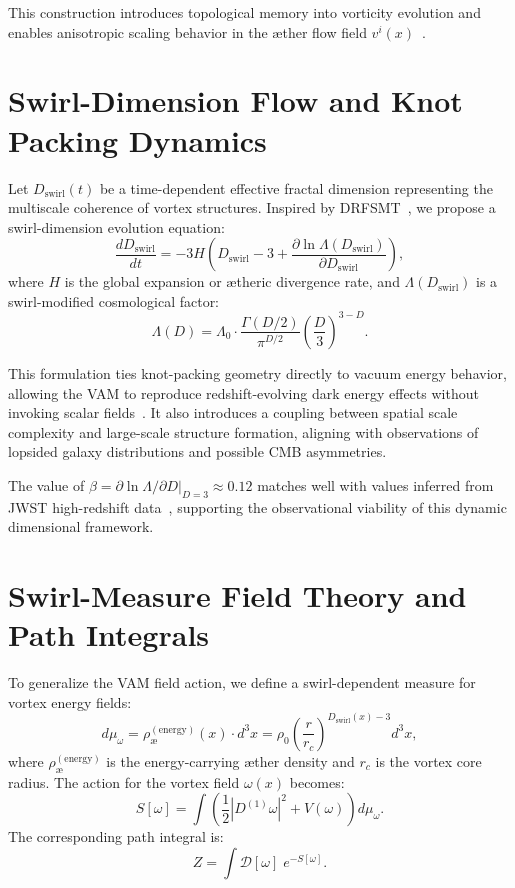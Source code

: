 \documentclass[11pt]{article}
\begin{document}
    This construction introduces topological memory into vorticity evolution and enables anisotropic scaling behavior in the æther flow field \( v^i(x) \)~\cite{zhou2025drfsmt}.

    \section{Swirl-Dimension Flow and Knot Packing Dynamics}

    Let \( D_\text{swirl}(t) \) be a time-dependent effective fractal dimension representing the multiscale coherence of vortex structures. Inspired by DRFSMT~\cite{zhou2025drfsmt}, we propose a swirl-dimension evolution equation:
    \[
        \frac{d D_\text{swirl}}{dt} = -3H \left( D_\text{swirl} - 3 + \frac{\partial \ln \Lambda(D_\text{swirl})}{\partial D_\text{swirl}} \right),
    \]
    where \( H \) is the global expansion or ætheric divergence rate, and \( \Lambda(D_\text{swirl}) \) is a swirl-modified cosmological factor:
    \[
        \Lambda(D) = \Lambda_0 \cdot \frac{\Gamma(D/2)}{\pi^{D/2}} \left(\frac{D}{3}\right)^{3-D}.
    \]

    This formulation ties knot-packing geometry directly to vacuum energy behavior, allowing the VAM to reproduce redshift-evolving dark energy effects without invoking scalar fields~\cite{vam2024swirl}. It also introduces a coupling between spatial scale complexity and large-scale structure formation, aligning with observations of lopsided galaxy distributions and possible CMB asymmetries.

    The value of \( \beta = \partial \ln \Lambda / \partial D \big|_{D=3} \approx 0.12 \) matches well with values inferred from JWST high-redshift data~\cite{zhou2025drfsmt}, supporting the observational viability of this dynamic dimensional framework.

    \section{Swirl-Measure Field Theory and Path Integrals}

    To generalize the VAM field action, we define a swirl-dependent measure for vortex energy fields:
    \[
        d\mu_\omega = \rho_\text{\ae}^{(\text{energy})}(x) \cdot d^3x = \rho_0 \left( \frac{r}{r_c} \right)^{D_\text{swirl}(x) - 3} d^3x,
    \]
    where \( \rho_\text{\ae}^{(\text{energy})} \) is the energy-carrying æther density and \( r_c \) is the vortex core radius. The action for the vortex field \( \omega(x) \) becomes:
    \[
        S[\omega] = \int \left( \frac{1}{2} |D^{(1)} \omega|^2 + V(\omega) \right) d\mu_\omega.
    \]
    The corresponding path integral is:
    \[
        Z = \int \mathcal{D}[\omega] \; e^{-S[\omega]}.
    \]
\end{document}
